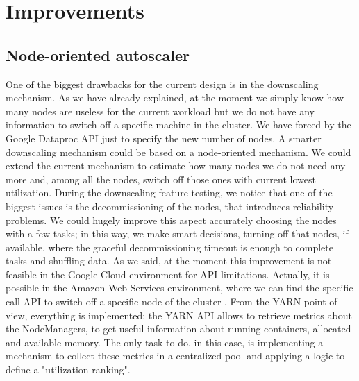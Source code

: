 \documentclass[12pt,twoside,cucitura]{toptesi}
\begin{document}
\section{Improvements}
\subsection{Node-oriented autoscaler}
One of the biggest drawbacks for the current design is in the downscaling mechanism. As we have already explained, at the moment we simply know how many nodes are useless for the current workload but we do not have any information to switch off a specific machine in the cluster. We have forced by the Google Dataproc API just to specify the new number of nodes. A smarter downscaling mechanism could be based on a node-oriented mechanism. We could extend the current mechanism to estimate how many nodes we do not need any more and, among all the nodes, switch off those ones with current lowest utilization. During the downscaling feature testing, we notice that one of the biggest issues is the decommissioning of the nodes, that introduces reliability problems. We could hugely improve this aspect accurately choosing the nodes with a few tasks; in this way, we make smart decisions, turning off that nodes, if available, where the graceful decommissioning timeout is enough to complete tasks and shuffling data.
As we said, at the moment this improvement is not feasible in the Google Cloud environment for API limitations. Actually, it is possible in the Amazon Web Services environment, where we can find the specific call API to switch off a specific node of the cluster \cite{aws-emr-downscaling}. From the YARN point of view, everything is implemented: the YARN API allows to retrieve metrics about the NodeManagers, to get useful information about running containers, allocated and available memory. The only task to do, in this case, is implementing a mechanism to collect these metrics in a centralized pool and applying a logic to define a "utilization ranking".
\end{document}
